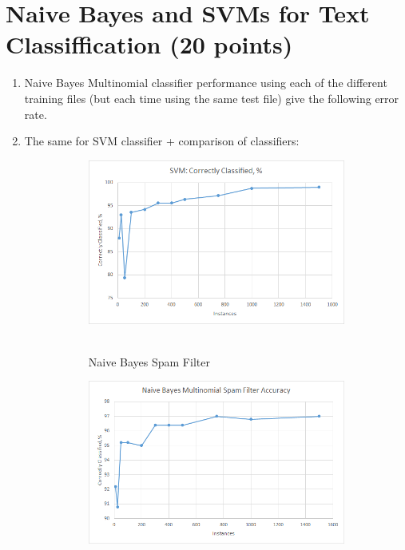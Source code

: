\documentclass{article}
\begin{document}
\section{Naive Bayes and SVMs for Text Classiffication (20 points)}	
\begin{enumerate}
	\item Naive Bayes Multinomial classifier performance using each of the different training files
	(but each time using the same test file) give the following error rate.
	\item The same for SVM classifier + comparison of classifiers:
	\begin{figure}[h!]
		\centering		
		\begin{subfigure}{.45\textwidth}
			\includegraphics[width=1\linewidth]{SVM_spam.png}\
			\caption{Naive Bayes Spam Filter}	
		\end{subfigure}
		\begin{subfigure}{.45\textwidth}
			\includegraphics[width=1\linewidth]{NBM_spam.png}\

\end{subfigure}
\end{figure}
\end{enumerate}
\end{document}
